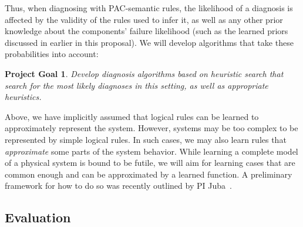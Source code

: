 \documentclass[12pt]{article}
\newtheorem{problem}{Project Goal}
\begin{document}
Thus, when diagnosing with PAC-semantic rules,  the likelihood of a diagnosis is affected by  the validity of the rules used to infer it, as well as any other prior knowledge about the components' failure likelihood (such as the learned priors discussed in earlier in this proposal). We will develop algorithms that take these probabilities into account:
\begin{problem}
Develop diagnosis algorithms based on heuristic search that search for the most likely diagnoses in this setting, as well as appropriate heuristics.
\end{problem}
Above, we have implicitly assumed that logical rules can be learned to approximately represent the system. However, systems may be too complex to be represented by simple logical rules. In such cases, we may also learn rules that {\em approximate} some parts of the system behavior. While learning a complete model of a physical system is bound to be futile, we will aim for learning cases that are common enough and can be approximated by a learned function. A preliminary framework for how to do so was recently outlined by PI Juba~\cite{juba2016aaai,juba2016conditional}.






\subsection{Evaluation}
\label{sec:evaluation}
\end{document}
